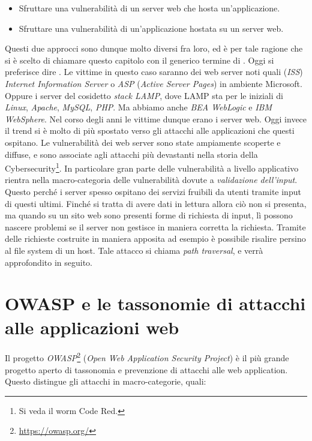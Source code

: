 \documentclass[14pt]{extreport}
\begin{document}
\begin{itemize}
    \item Sfruttare una vulnerabilità di un server web che hosta un'applicazione.
    
    
    \item Sfruttare una vulnerabilità di un'applicazione hostata su un server web.
\end{itemize}

Questi due approcci sono dunque molto diversi fra loro, ed è per tale ragione che si è scelto di chiamare questo capitolo con il generico termine di . Oggi si preferisce dire . Le vittime in questo caso saranno dei web server noti quali (\textit{ISS}) \textit{Internet Information Server} o \textit{ASP} (\textit{Active Server Pages}) in ambiente Microsoft. Oppure i server del cosidetto \textit{stack LAMP}, dove LAMP sta per le iniziali di \textit{Linux}, \textit{Apache}, \textit{MySQL}, \textit{PHP}. Ma abbiamo anche \textit{BEA WebLogic} e \textit{IBM WebSphere}.
Nel corso degli anni le vittime dunque erano i server web. Oggi invece il trend si è molto di più spostato verso gli attacchi alle applicazioni che questi ospitano.
Le vulnerabilità dei web server sono state ampiamente scoperte e diffuse, e sono associate agli attacchi più devastanti nella storia della Cybersecurity\footnote{Si veda il worm Code Red.}. In particolare gran parte delle vulnerabilità a livello applicativo rientra nella macro-categoria delle vulnerabilità dovute a \textit{validazione dell'input}. Questo perché i server spesso ospitano dei servizi fruibili da utenti tramite input di questi ultimi. Finché si tratta di avere dati in lettura allora ciò non si presenta, ma quando su un sito web sono presenti forme di richiesta di input, lì possono nascere problemi se il server non gestisce in maniera corretta la richiesta. Tramite delle richieste costruite in maniera apposita ad esempio è possibile risalire persino al file system di un host. Tale attacco si chiama \textit{path traversal}, e verrà approfondito in seguito.

\section{OWASP e le tassonomie di attacchi alle applicazioni web}

Il progetto \textit{OWASP}\footnote{\url{https://owasp.org/}} (\textit{Open Web Application Security Project}) è il più grande progetto aperto di tassonomia e prevenzione di attacchi alle web application. Questo distingue gli attacchi in macro-categorie, quali:
\end{document}
